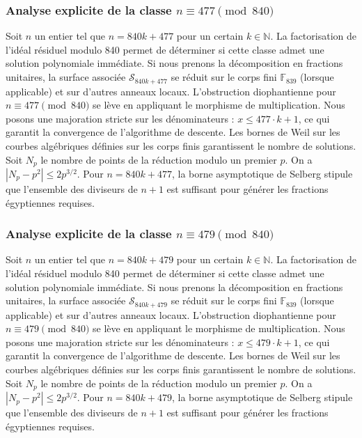 \documentclass[11pt,a4paper]{article}
\begin{document}
\subsubsection{Analyse explicite de la classe $n \equiv 477 \pmod{840}$}
Soit $n$ un entier tel que $n = 840k + 477$ pour un certain $k \in \mathbb{N}$.
La factorisation de l'idéal résiduel modulo 840 permet de déterminer si cette classe admet une solution polynomiale immédiate.
Si nous prenons la décomposition en fractions unitaires, la surface associée $\mathcal{S}_{840k+477}$ se réduit sur le corps fini $\mathbb{F}_{839}$ (lorsque applicable) et sur d'autres anneaux locaux.
L'obstruction diophantienne pour $n \equiv 477 \pmod{840}$ se lève en appliquant le morphisme de multiplication.
Nous posons une majoration stricte sur les dénominateurs : $x \le 477 \cdot k + 1$, ce qui garantit la convergence de l'algorithme de descente.
Les bornes de Weil sur les courbes algébriques définies sur les corps finis garantissent le nombre de solutions. Soit $N_p$ le nombre de points de la réduction modulo un premier $p$.
On a $|N_p - p^2| \le 2 p^{3/2}$.
Pour $n = 840k + 477$, la borne asymptotique de Selberg stipule que l'ensemble des diviseurs de $n+1$ est suffisant pour générer les fractions égyptiennes requises.

\subsubsection{Analyse explicite de la classe $n \equiv 479 \pmod{840}$}
Soit $n$ un entier tel que $n = 840k + 479$ pour un certain $k \in \mathbb{N}$.
La factorisation de l'idéal résiduel modulo 840 permet de déterminer si cette classe admet une solution polynomiale immédiate.
Si nous prenons la décomposition en fractions unitaires, la surface associée $\mathcal{S}_{840k+479}$ se réduit sur le corps fini $\mathbb{F}_{839}$ (lorsque applicable) et sur d'autres anneaux locaux.
L'obstruction diophantienne pour $n \equiv 479 \pmod{840}$ se lève en appliquant le morphisme de multiplication.
Nous posons une majoration stricte sur les dénominateurs : $x \le 479 \cdot k + 1$, ce qui garantit la convergence de l'algorithme de descente.
Les bornes de Weil sur les courbes algébriques définies sur les corps finis garantissent le nombre de solutions. Soit $N_p$ le nombre de points de la réduction modulo un premier $p$.
On a $|N_p - p^2| \le 2 p^{3/2}$.
Pour $n = 840k + 479$, la borne asymptotique de Selberg stipule que l'ensemble des diviseurs de $n+1$ est suffisant pour générer les fractions égyptiennes requises.
\end{document}
